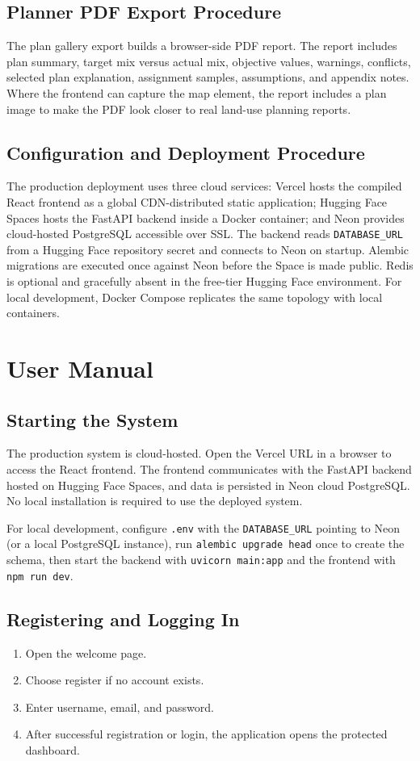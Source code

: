 \documentclass[12pt,a4paper,oneside]{report}
\newcommand{\code}[1]{\texttt{#1}}
\begin{document}
\section{Planner PDF Export Procedure}
The plan gallery export builds a browser-side PDF report. The report includes plan summary, target mix versus actual mix, objective values, warnings, conflicts, selected plan explanation, assignment samples, assumptions, and appendix notes. Where the frontend can capture the map element, the report includes a plan image to make the PDF look closer to real land-use planning reports.

\section{Configuration and Deployment Procedure}
The production deployment uses three cloud services: Vercel hosts the compiled React frontend as a global CDN-distributed static application; Hugging Face Spaces hosts the FastAPI backend inside a Docker container; and Neon provides cloud-hosted PostgreSQL accessible over SSL. The backend reads \code{DATABASE\_URL} from a Hugging Face repository secret and connects to Neon on startup. Alembic migrations are executed once against Neon before the Space is made public. Redis is optional and gracefully absent in the free-tier Hugging Face environment. For local development, Docker Compose replicates the same topology with local containers.

\chapter{User Manual}
\section{Starting the System}
The production system is cloud-hosted. Open the Vercel URL in a browser to access the React frontend. The frontend communicates with the FastAPI backend hosted on Hugging Face Spaces, and data is persisted in Neon cloud PostgreSQL. No local installation is required to use the deployed system.

For local development, configure \code{.env} with the \code{DATABASE\_URL} pointing to Neon (or a local PostgreSQL instance), run \code{alembic upgrade head} once to create the schema, then start the backend with \code{uvicorn main:app} and the frontend with \code{npm run dev}.

\section{Registering and Logging In}
\begin{enumerate}
  \item Open the welcome page.
  \item Choose register if no account exists.
  \item Enter username, email, and password.
  \item After successful registration or login, the application opens the protected dashboard.
\end{enumerate}
\end{document}
